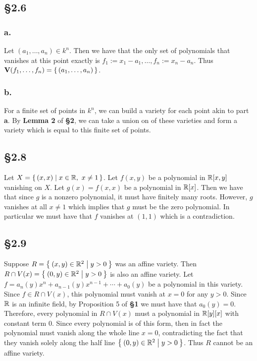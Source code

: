 \documentclass[letterpaper]{article}
\begin{document}
\subsection*{\S 2.6}

\subsubsection*{a.}

Let $(a_{1}, \ldots, a_{n}) \in k^{n}$.
Then we have that the only set of polynomials that vanishes at this point exactly is $f_{1} := x_{1} - a_{1}, \ldots, f_{n} := x_{n} - a_{n}$.
Thus $\textbf{V}(f_{1}, \ldots, f_{n}) = \set{(a_{1}, \ldots, a_{n})}$.

\subsubsection*{b.}

For a finite set of points in $k^{n}$, we can build a variety for each point akin to part \textbf{a}.
By \textbf{Lemma 2} of \textbf{\S 2}, we can take a union on of these varieties and form a variety which is equal to this finite set of points.

\subsection*{\S 2.8}

Let $X = \set{(x, x) | x \in \mathbb{R},~ x \neq 1}$.
Let $f(x, y)$ be a polynomial in $\mathbb{R}[x, y]$ vanishing on $X$.
Let $g(x) = f(x, x)$ be a polynomial in $\mathbb{R}[x]$.
Then we have that since $g$ is a nonzero polynomial, it must have finitely many roots.
However, $g$ vanishes at all $x \neq 1$ which implies that $g$ must be the zero polynomial.
In particular we must have that $f$ vanishes at $(1, 1)$ which is a contradiction.

\clearpage

\subsection*{\S 2.9}

Suppose $R = \Set{(x, y) \in \mathbb{R}^{2} | y > 0}$ was an affine variety.
Then $R \cap V(x) = \Set{(0, y) \in \mathbb{R}^{2} | y > 0}$ is also an affine variety.
Let $f = a_{n}(y)x^{n} + a_{n - 1}(y)x^{n - 1} + \cdots + a_{0}(y)$ be a polynomial in this variety.
Since $f \in R \cap V(x)$, this polynomial must vanish at $x = 0$ for any $y > 0$.
Since $\mathbb{R}$ is an infinite field, by Proposition 5 of \textbf{\S 1} we must have that $a_{0}(y) = 0$.
Therefore, every polynomial in $R \cap V(x)$ must a polynomial in $\mathbb{R}[y][x]$ with constant term $0$.
Since every polynomial is of this form, then in fact the polynomial must vanish along the whole line $x = 0$, contradicting the fact that they vanish solely along the half line $\Set{(0, y) \in \mathbb{R}^{2} | y > 0}$.
Thus $R$ cannot be an affine variety.
\end{document}
